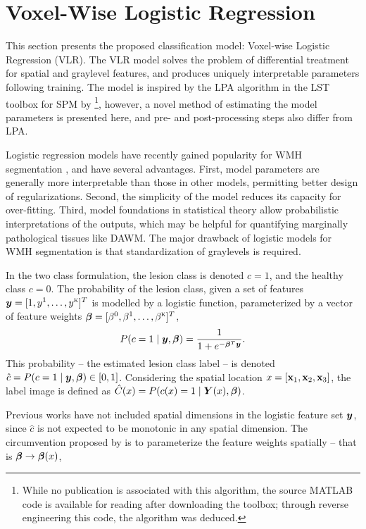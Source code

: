 \section{Voxel-Wise Logistic Regression}\label{s:vlr}
This section presents the proposed classification model: Voxel-wise Logistic Regression (VLR). The VLR model solves the problem of differential treatment for spatial and graylevel features, and produces uniquely interpretable parameters following training. The model is inspired by the LPA algorithm in the LST toolbox for SPM by \citeauthor{Schmidt2015} \cite{Schmidt2015}\footnote{While no publication is associated with this algorithm, the source MATLAB code is available for reading after downloading the toolbox; through reverse engineering this code, the algorithm was deduced.}, however, a novel method of estimating the model parameters is presented here, and pre- and post-processing steps also differ from LPA.
\par
Logistic regression models have recently gained popularity for WMH segmentation \cite{Sweeney2013a,Sweeney2013,Schmidt2015,Zhan2017}, and have several advantages.
First, model parameters are generally more interpretable than those in other models, permitting better design of regularizations.
Second, the simplicity of the model reduces its capacity for over-fitting. 
Third, model foundations in statistical theory allow probabilistic interpretations of the outputs, which may be helpful for quantifying marginally pathological tissues like DAWM.
The major drawback of logistic models for WMH segmentation is that standardization of graylevels is required.
\par
In the two class formulation, the lesion class is denoted $c=1$, and the healthy class $c=0$. The probability of the lesion class, given a set of features $\bm{y} = [1,y^1,\dots,y^{\textsc{k}}]^T$ is modelled by a logistic function, parameterized by a vector of feature weights $\bm{\beta} = [\beta^0,\beta^1,\dots,\beta^{\textsc{k}}]^T$,
\begin{equation}
  P(c=1\mid\bm{y},\bm{\beta}) = \frac{1}{1+e^{-\bm{\beta}^T\bm{y}}}.
  \label{eq:lrmodel}
\end{equation}
This probability -- the estimated lesion class label -- is denoted $\hat{c} = P(c=1\mid\bm{y},\bm{\beta}) \in [0,1]$. Considering the spatial location $x = [\mathbf{x}_1,\mathbf{x}_2,\mathbf{x}_3]$, the label image is defined as $\hat{C}(x) = P(c(x)=1\mid\bm{Y}(x),\bm{\beta})$.
\par
Previous works have not included spatial dimensions in the logistic feature set $\bm{y}$, since $\hat{c}$ is not expected to be monotonic in any spatial dimension. The circumvention proposed by \citeauthor{Schmidt2015} is to parameterize the feature weights spatially -- that is $\bm{\beta}\rightarrow\bm{\beta}(x)$,
